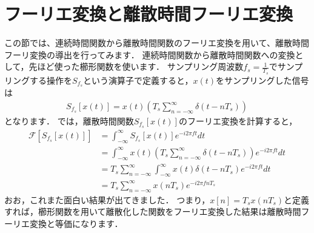 \section{フーリエ変換と離散時間フーリエ変換}

この節では、連続時間関数から離散時間関数のフーリエ変換を用いて、離散時間フーリ変換の導出を行ってみます．
連続時間関数から離散時間関数への変換として，先ほど使った櫛形関数を使います．
サンプリング周波数$f_s=\frac{1}{T_s}$でサンプリングする操作を$S_{f_s}$という演算子で定義すると，$x(t)$をサンプリングした信号は
\begin{align}
S_{f_s}[x(t)] = x(t) \left(T_s \sum_{n=-\infty}^{\infty} \delta\left(t- nT_s\right) \right)
\end{align}
となります．
では，離散時間関数$S_{f_s}[x(t)]$のフーリエ変換を計算すると，
\begin{align}
\mathcal{F}[S_{f_s}[x(t)]] &= \int_{-\infty}^{\infty} S_{f_s}[x(t)] e^{-i2\pi ft} dt\nonumber\\
    &= \int_{-\infty}^{\infty} x(t) \left(T_s \sum_{n=-\infty}^{\infty} \delta\left(t- nT_s\right) \right) e^{-i2\pi ft} dt \nonumber\\
    &= T_s \sum_{n=-\infty}^{\infty} \int_{-\infty}^{\infty} x(t) \delta\left(t- nT_s\right) e^{-i2\pi ft} dt \nonumber\\
    &= T_s \sum_{n=-\infty}^{\infty} x\left(nT_s\right) e^{-i2\pi fnT_s}
\end{align}
おお，これまた面白い結果が出てきました．
つまり，$x[n]=T_s x(nT_s)$と定義すれば，櫛形関数を用いて離散化した関数をフーリエ変換した結果は離散時間フーリエ変換と等価になります．

